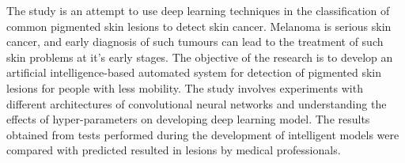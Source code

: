 The study is an attempt to use deep learning techniques in the classification of common pigmented skin lesions to detect skin cancer. Melanoma is serious skin cancer, and early diagnosis of such tumours can lead to the treatment of such skin problems at it’s early stages. The objective of the research is to develop an artificial intelligence-based automated system for detection of pigmented skin lesions for people with less mobility. The study involves experiments with different architectures of convolutional neural networks and understanding the effects of hyper-parameters on developing deep learning model. The results obtained from tests performed during the development of intelligent models were compared with predicted resulted in lesions by medical professionals.
